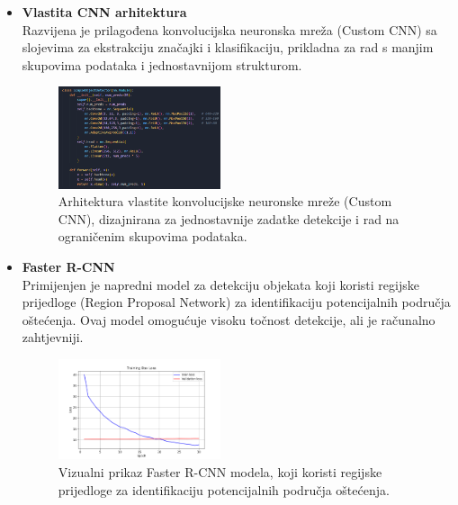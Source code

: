 \documentclass[conference]{IEEEtran}
\begin{document}
\begin{itemize}
    \item \textbf{Vlastita CNN arhitektura} \\
    Razvijena je prilagođena konvolucijska neuronska mreža (Custom CNN) sa slojevima za ekstrakciju značajki i klasifikaciju, prikladna za rad s manjim skupovima podataka i jednostavnijom strukturom.
    \begin{figure}[htbp]
    \centerline{\includegraphics[width=0.45\textwidth]{Images/CustomCNN.png}}
    \caption{Arhitektura vlastite konvolucijske neuronske mreže (Custom CNN), dizajnirana za jednostavnije zadatke detekcije i rad na ograničenim skupovima podataka.}
    \label{fig:customcnn}
    \end{figure}

    \item \textbf{Faster R-CNN} \\
    Primijenjen je napredni model za detekciju objekata koji koristi regijske prijedloge (Region Proposal Network) za identifikaciju potencijalnih područja oštećenja. Ovaj model omogućuje visoku točnost detekcije, ali je računalno zahtjevniji.
    \begin{figure}[htbp]
    \centerline{\includegraphics[width=0.45\textwidth]{Images/FasterCNN.png}}
    \caption{Vizualni prikaz Faster R-CNN modela, koji koristi regijske prijedloge za identifikaciju potencijalnih područja oštećenja.}
    \label{fig:fasterrcnn}
    \end{figure}


\end{itemize}
\end{document}
